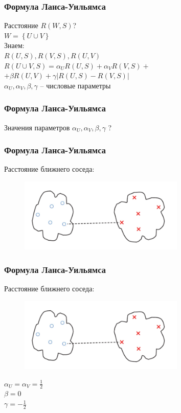 \documentclass[12pt]{beamer}
\begin{document}
\begin{frame}\frametitle{Формула Ланса-Уильямса}
Расстояние $R(W, S)$?\\
${ W = \left\{ U \cup V \right\} }$\\
\vspace{5mm}
Знаем:\\
${R(U, S), R(V, S), R(U, V)}$\\
\vspace{5mm}
${R(U \cup V, S) = \alpha_U R(U, S) + \alpha_V R(V, S) + }$ \\
\hspace{30mm} ${ + \beta R(U, V) + \gamma \vert R(U, S) - R(V, S)\vert}$\\
\vspace{5mm}
${\alpha_U, \alpha_V, \beta, \gamma}$ -- числовые параметры
\end{frame}

\begin{frame}\frametitle{Формула Ланса-Уильямса}
Значения параметров
${\alpha_U, \alpha_V, \beta, \gamma}$ ?
\end{frame}

\begin{frame}\frametitle{Формула Ланса-Уильямса}
Расстояние ближнего соседа:\\
\begin{figure}[htbp]
  \includegraphics[height=100pt, keepaspectratio = true]{images/lans1}  
\end{figure}
\end{frame}

\begin{frame}\frametitle{Формула Ланса-Уильямса}
Расстояние ближнего соседа:\\
\begin{figure}[htbp]
  \includegraphics[height=100pt, keepaspectratio = true]{images/lans1}  
\end{figure}
${\alpha_U = \alpha_V = \frac{1}{2}}$ \\${\beta = 0}$ \\${\gamma = -\frac{1}{2}}$
\end{frame}
\end{document}
